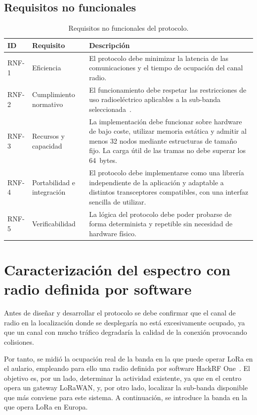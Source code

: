 \subsection{Requisitos no funcionales}
\begin{table}[htbp]
    \centering
    \caption{Requisitos no funcionales del protocolo.}
    \label{tab:requisitos-no-funcionales}
    \renewcommand{\arraystretch}{1.3}
    \begin{tabularx}{\textwidth}{l l X}
        \toprule
        \textbf{ID} & \textbf{Requisito} & \textbf{Descripción} \\
        \midrule
        RNF-1 & Eficiencia & El protocolo debe minimizar la latencia de las comunicaciones y el tiempo de ocupación del canal radio. \\\midrule
        RNF-2 & Cumplimiento normativo & El funcionamiento debe respetar las restricciones de uso radioeléctrico aplicables a la sub-banda seleccionada~\cite{etsien3002202,ercrec7003}. \\ \midrule
        RNF-3 & Recursos y capacidad & La implementación debe funcionar sobre hardware de bajo coste, utilizar memoria estática y admitir al menos 32 nodos mediante estructuras de tamaño fijo. La carga útil de las tramas no debe superar los 64~bytes. \\ \midrule
        RNF-4 & Portabilidad e integración & El protocolo debe implementarse como una librería independiente de la aplicación y adaptable a distintos transceptores compatibles, con una interfaz sencilla de utilizar. \\ \midrule
        RNF-5 & Verificabilidad & La lógica del protocolo debe poder probarse de forma determinista y repetible sin necesidad de hardware físico. \\ 
        \bottomrule
    \end{tabularx}
\end{table}

\section{Caracterización del espectro con radio definida por software}\label{sec:sdr}

Antes de diseñar y desarrollar el protocolo se debe confirmar que el canal de radio en la localización donde se desplegaría no está excesivamente ocupado, ya que un canal con mucho tráfico degradaría la calidad de la conexión provocando colisiones. 


Por tanto, se midió la ocupación real de la banda en la que puede operar LoRa en el aulario, empleando para ello una radio definida por software HackRF One~\cite{hackrfone}. El objetivo es, por un lado, determinar la actividad existente, ya que en el centro opera un gateway LoRaWAN, y, por otro lado, localizar la sub-banda disponible que más conviene para este sistema. A continuación, se introduce la banda en la que opera LoRa en Europa.

